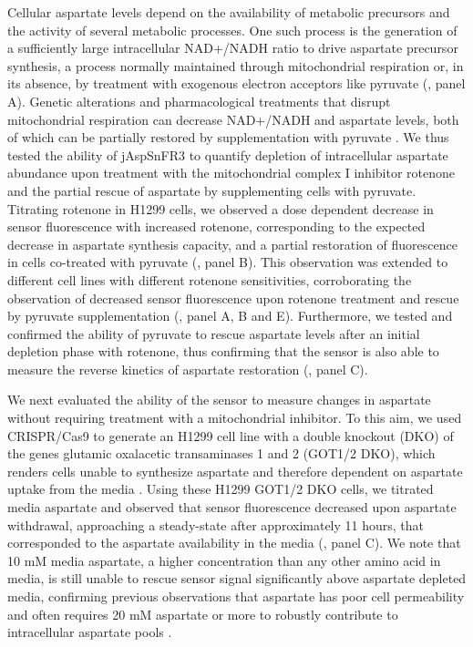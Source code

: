 \documentclass[9pt,lineno]{elife}
\begin{document}
Cellular aspartate levels depend on the availability of metabolic precursors and the activity of several metabolic processes.
One such process is the generation of a sufficiently large intracellular NAD+/NADH ratio to drive aspartate precursor synthesis, a process normally maintained through mitochondrial respiration or, in its absence, by treatment with exogenous electron acceptors like pyruvate (, panel A).
Genetic alterations and pharmacological treatments that disrupt mitochondrial respiration can decrease NAD+/NADH and aspartate levels, both of which can be partially restored by supplementation with pyruvate \citep{Sullivan2015-xf, Birsoy2015-pg}.
We thus tested the ability of jAspSnFR3 to quantify depletion of intracellular aspartate abundance upon treatment with the mitochondrial complex I inhibitor rotenone and the partial rescue of aspartate by supplementing cells with pyruvate.
Titrating rotenone in H1299 cells, we observed a dose dependent decrease in sensor fluorescence with increased rotenone, corresponding to the expected decrease in aspartate synthesis capacity, and a partial restoration of fluorescence in cells co-treated with pyruvate (, panel B).
This observation was extended to different cell lines with different rotenone sensitivities, corroborating the observation of decreased sensor fluorescence upon rotenone treatment and rescue by pyruvate supplementation (, panel A, B and E).
Furthermore, we tested and confirmed the ability of pyruvate to rescue aspartate levels after an initial depletion phase with rotenone, thus confirming that the sensor is also able to measure the reverse kinetics of aspartate restoration (, panel C).

We next evaluated the ability of the sensor to measure changes in aspartate without requiring treatment with a mitochondrial inhibitor.
To this aim, we used CRISPR/Cas9 to generate an H1299 cell line with a double knockout (DKO) of the genes glutamic oxalacetic transaminases 1 and 2 (GOT1/2 DKO), which renders cells unable to synthesize aspartate and therefore dependent on aspartate uptake from the media \citep{Garcia-Bermudez2022-qn}.
Using these H1299 GOT1/2 DKO cells, we titrated media aspartate and observed that sensor fluorescence decreased upon aspartate withdrawal, approaching a steady-state after approximately 11 hours, that corresponded to the aspartate availability in the media (, panel C).
We note that 10 mM media aspartate, a higher concentration than any other amino acid in media, is still unable to rescue sensor signal significantly above aspartate depleted media, confirming previous observations that aspartate has poor cell permeability and often requires 20 mM aspartate or more to robustly contribute to intracellular aspartate pools \citep{Sullivan2018-gz}.
\end{document}
